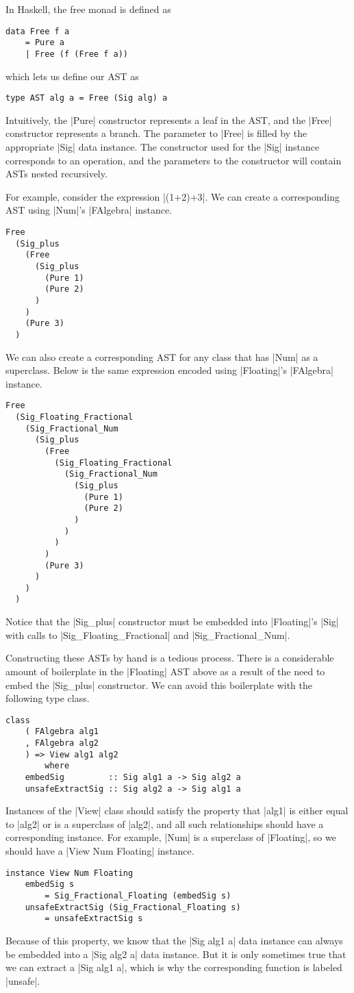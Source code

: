 \documentclass[preprint]{sigplanconf}
\theoremstyle{definition}
\begin{document}
In Haskell, the free monad is defined as
\begin{lstlisting}
data Free f a
    = Pure a
    | Free (f (Free f a))
\end{lstlisting}
which lets us define our AST as
\begin{lstlisting}
type AST alg a = Free (Sig alg) a
\end{lstlisting}
Intuitively,
the |Pure| constructor represents a leaf in the AST,
and the |Free| constructor represents a branch.
The parameter to |Free| is filled by the appropriate |Sig| data instance.
The constructor used for the |Sig| instance corresponds to an operation,
and the parameters to the constructor will contain ASTs nested recursively.

For example, consider the expression |(1+2)+3|.
We can create a corresponding AST using |Num|'s |FAlgebra| instance.
\begin{lstlisting}
Free
  (Sig_plus
    (Free
      (Sig_plus
        (Pure 1)
        (Pure 2)
      )
    )
    (Pure 3)
  )
\end{lstlisting}
We can also create a corresponding AST for any class that has |Num| as a superclass.
Below is the same expression encoded using |Floating|'s |FAlgebra| instance.
\begin{lstlisting}
Free
  (Sig_Floating_Fractional
    (Sig_Fractional_Num
      (Sig_plus
        (Free
          (Sig_Floating_Fractional
            (Sig_Fractional_Num
              (Sig_plus
                (Pure 1)
                (Pure 2)
              )
            )
          )
        )
        (Pure 3)
      )
    )
  )
\end{lstlisting}
Notice that the |Sig_plus| constructor must be embedded into |Floating|'s |Sig| with calls to |Sig_Floating_Fractional| and |Sig_Fractional_Num|.

Constructing these ASTs by hand is a tedious process.
There is a considerable amount of boilerplate in the |Floating| AST above as a result of the need to embed the |Sig_plus| constructor.
We can avoid this boilerplate with the following type class.
\begin{lstlisting}
class
    ( FAlgebra alg1
    , FAlgebra alg2
    ) => View alg1 alg2
        where
    embedSig         :: Sig alg1 a -> Sig alg2 a
    unsafeExtractSig :: Sig alg2 a -> Sig alg1 a
\end{lstlisting}
Instances of the |View| class should satisfy the property that |alg1| is either equal to |alg2| or is a superclass of |alg2|, and
all such relationships should have a corresponding instance.
For example, |Num| is a superclass of |Floating|,
so we should have a |View Num Floating| instance.
\begin{lstlisting}
instance View Num Floating
    embedSig s
        = Sig_Fractional_Floating (embedSig s)
    unsafeExtractSig (Sig_Fractional_Floating s)
        = unsafeExtractSig s
\end{lstlisting}
Because of this property, we know that the |Sig alg1 a| data instance can always be embedded into a |Sig alg2 a| data instance.
But it is only sometimes true that we can extract a |Sig alg1 a|,
which is why the corresponding function is labeled |unsafe|.
\end{document}
